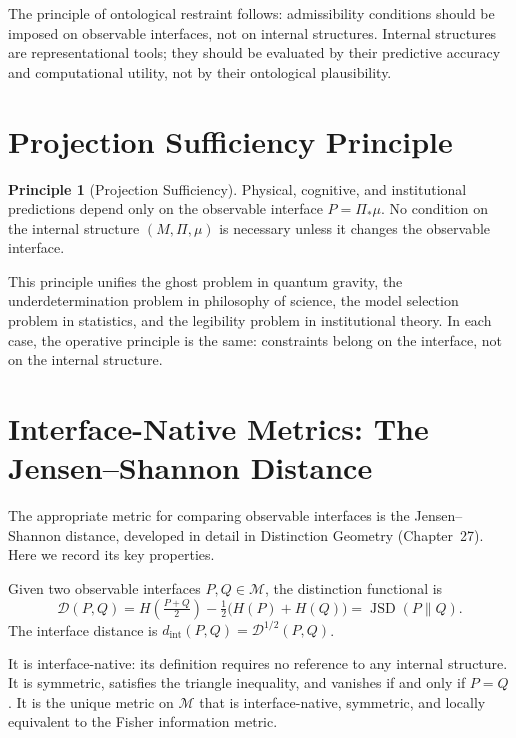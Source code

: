 \documentclass[12pt,a4paper]{book}
\theoremstyle{remark}
\theoremstyle{definition}
\newtheorem{principle}{Principle}[chapter]
\begin{document}
The principle of ontological restraint follows: admissibility conditions
should be imposed on observable interfaces, not on internal structures.
Internal structures are representational tools; they should be evaluated
by their predictive accuracy and computational utility, not by their
ontological plausibility.

\section{Projection Sufficiency Principle}

\begin{principle}[Projection Sufficiency]
Physical, cognitive, and institutional predictions depend only on the
observable interface $P = \Pi_*\mu$. No condition on the internal
structure $(M, \Pi, \mu)$ is necessary unless it changes the observable
interface.
\end{principle}

This principle unifies the ghost problem in quantum gravity, the
underdetermination problem in philosophy of science, the model selection
problem in statistics, and the legibility problem in institutional theory.
In each case, the operative principle is the same: constraints belong on
the interface, not on the internal structure.

\section{Interface-Native Metrics: The Jensen--Shannon Distance}

The appropriate metric for comparing observable interfaces is the
Jensen--Shannon distance, developed in detail in Distinction Geometry
(Chapter~27). Here we record its key properties.

Given two observable interfaces $P, Q \in \mathcal{M}$, the distinction
functional is
\begin{equation}
  \mathcal{D}(P,Q)
  = H\!\left(\tfrac{P+Q}{2}\right)
    - \tfrac{1}{2}\bigl(H(P) + H(Q)\bigr)
  = \operatorname{JSD}(P\|Q).
\end{equation}
The interface distance is $d_{\mathrm{int}}(P,Q) = \mathcal{D}^{1/2}(P,Q)$.

It is interface-native: its definition requires no reference to any
internal structure. It is symmetric, satisfies the triangle inequality,
and vanishes if and only if $P = Q$. It is the unique metric on
$\mathcal{M}$ that is interface-native, symmetric, and locally equivalent
to the Fisher information metric.
\end{document}
